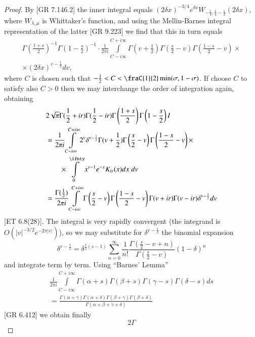 \begin{proof}
By [GR 7.146.2] the inner integral equals $(2 \delta x)^{-3/4} e^{\delta x} W_{-\frac{1}{4}, \frac{1}{4} -\frac{s}{2}} (2 \delta x)$, where $W_{\lambda, \mu}$  is Whittaker's function, and using the Mellin-Barnes integral representation of the latter [GR 9.223] we find that this in turn equals 
\begin{gather*}
\Gamma \left(\frac{1+s}{2} \right)^{-1} \Gamma \left(1-\frac{s}{2} \right)^{-1} \cdot \frac{1}{2 \pi i} \int\limits^{C + i \infty}_{C - i \infty} \Gamma (v+ \frac{1}{2}) \Gamma (\frac{s}{2}-v) \Gamma (\frac{1-s}{2} -v) \times \\
\times (2\delta x)^{v - \frac{1}{2}} d v, 
\end{gather*}
where $C$ is chosen such that $-\frac{1}{2} < C < \fraC{1}{2} \min (\sigma, 1 -\sigma)$. If choose $C$ to satisfy also $C>0$ then we may interchange the order of integration again, obtaining
\begin{align*}
& 2 \sqrt{\pi} \Gamma (\frac{1}{2} + ir) \Gamma (\frac{1}{2} -ir) \Gamma \left(\frac{1+s}{2} \right) \Gamma \left(1-\frac{s}{2} \right) I\\
&  =\frac{1}{2 \pi i} \int\limits^{C+ i \infty}_{C -  i \infty} 2^v \delta^{v -\frac{1}{2}} \Gamma (v + \frac{1}{2}) \Gamma \left(\frac{s}{2} -v \right) \Gamma \left(\frac{1-s}{2} - v \right) \times \\
& \qquad \times \int\limits^\ifnty_{0} x^{v-1} e^{-x} K_{ir} (x) dx \; d v\\
& =\frac{\Gamma (\frac{1}{2})}{2 \pi i} \int\limits^{C + i \infty}_{C - i \infty} \Gamma \left(\frac{s}{2} -v \right) \Gamma \left(\frac{1-s}{2} -v \right) \Gamma (v+ ir) \Gamma (v - ir) \delta^{v -\frac{1}{2}} dv 
\end{align*}
[ET 6.8(28)]. The integral is very rapidly convergent (the integrand is $O(|v|^{-3/2} e^{-2 \pi|v|})$), so we may substitute for $\delta^{v -\frac{1}{2}}$ the binomial expansion
$$
\delta^{v -\frac{1}{2}} =\delta^{\frac{1}{2} (s-1)} \sum\limits^\infty_{n=0} \frac{1}{n!}  \frac{\Gamma \left(\frac{s}{2} - v + n \right)}{\Gamma \left(\frac{s}{2} -v \right)} (1-\delta)^n
$$
and integrate term by term. Using ``Barnes' Lemma''
\begin{gather*}
\frac{1}{2 \pi i} \int\limits^{C + i \infty}_{C - i \infty} \Gamma (\alpha +s) \Gamma (\beta +s) \Gamma (\gamma -s) \Gamma (\delta -s) ds\\
= \frac{\Gamma (\alpha + \gamma) \Gamma (\alpha + \delta) \Gamma (\beta + \gamma) \Gamma (\beta + \delta)}{\Gamma (\alpha + \beta + \gamma + \delta)}
\end{gather*}
[GR 6.412] we obtain finally
$$
2 \Gamma
$$



\end{proof}








